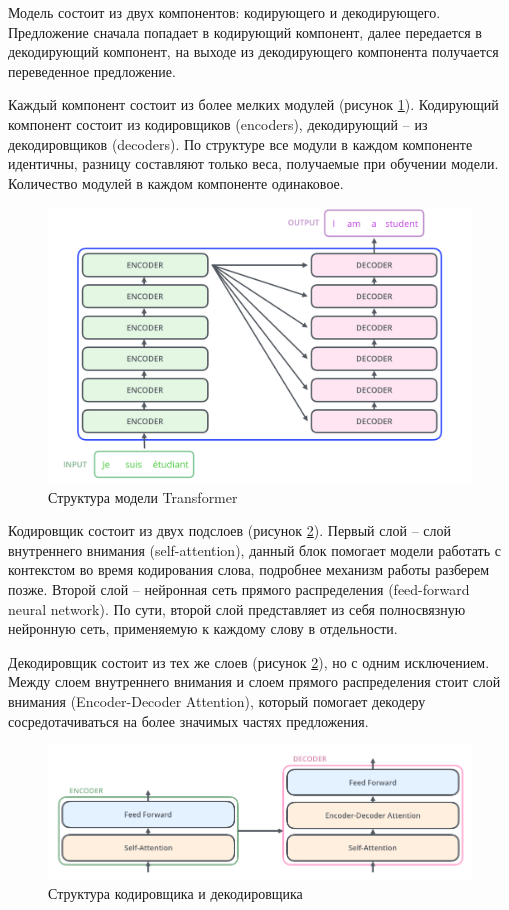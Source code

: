 \documentclass[a4paper,14pt]{article}
\begin{document}
Модель состоит из двух компонентов: кодирующего и декодирующего.
Предложение сначала попадает в кодирующий компонент, далее передается в декодирующий компонент, на выходе из декодирующего компонента получается переведенное предложение.

Каждый компонент состоит из более мелких модулей (рисунок \ref{fig:bertgroups}).
Кодирующий компонент состоит из кодировщиков (encoders), декодирующий -- из декодировщиков (decoders).
По структуре все модули в каждом компоненте идентичны, разницу составляют только веса, получаемые при обучении модели.
Количество модулей в каждом компоненте одинаковое.

\begin{figure}[H]
	\centering
	\includegraphics[width=0.6\linewidth]{image/bert_groups}
	\caption{Структура модели Transformer}
	\label{fig:bertgroups}
\end{figure}


Кодировщик состоит из двух подслоев (рисунок \ref{fig:bertencdec}).
Первый слой -- слой внутреннего внимания (self-attention), данный блок помогает модели работать с контекстом во время кодирования слова, подробнее механизм работы разберем позже.
Второй слой -- нейронная сеть прямого распределения (feed-forward neural network).
По сути, второй слой представляет из себя полносвязную нейронную сеть, применяемую к каждому слову в отдельности.

Декодировщик состоит из тех же слоев (рисунок \ref{fig:bertencdec}), но с одним исключением.
Между слоем внутреннего внимания и слоем прямого распределения стоит слой внимания (Encoder-Decoder Attention), который помогает декодеру 	сосредотачиваться на более значимых частях предложения.

\begin{figure}[H]
	\centering
	\includegraphics[width=0.8\linewidth]{image/bert_enc_dec}
	\caption{Структура кодировщика и декодировщика}
	\label{fig:bertencdec}
\end{figure}
\end{document}
